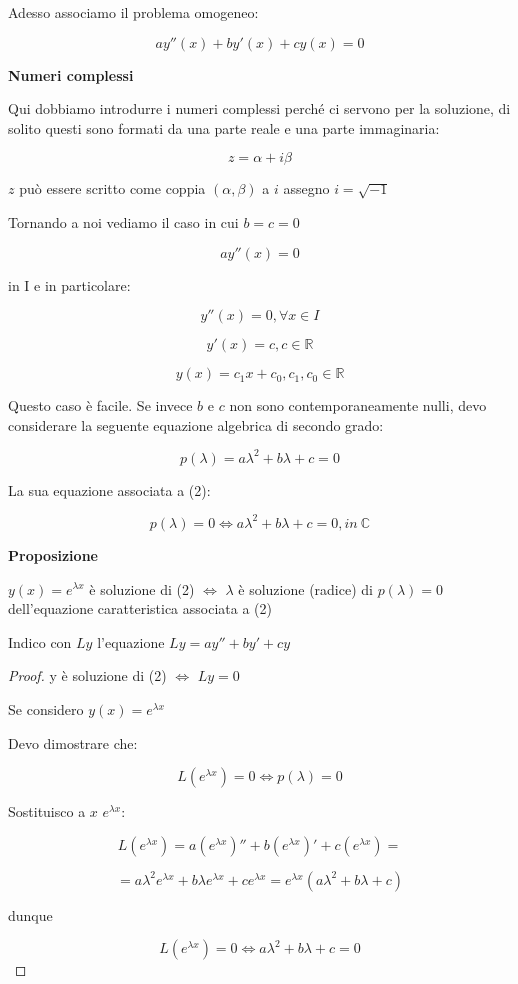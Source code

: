 \documentclass[11pt]{article}
\begin{document}
Adesso associamo il problema omogeneo:

\[
    ay''(x) + by'(x) + cy(x) = 0
\]

\textbf{Numeri complessi} 

Qui dobbiamo introdurre i numeri complessi perché ci servono per la soluzione, di solito questi sono formati da una parte reale e una parte immaginaria:

\[
    z = \alpha + i\beta
\]

$z$ può essere scritto come coppia $(\alpha,\beta)$ a $i$ assegno $i=\sqrt{-1}$

Tornando a noi vediamo il caso in cui $b=c=0$

\[
    ay''(x) = 0
\]

in I e in particolare:

\[
    y''(x) = 0, \forall x \in I
\]

\[
    y'(x) = c, c \in \mathbb{R}
\]

\[
    y(x) = c_1x+c_0,c_1,c_0 \in \mathbb{R}
\]

Questo caso è facile. Se invece $b$ e $c$ non sono contemporaneamente nulli, devo considerare la seguente equazione algebrica di secondo grado:

\[
    p(\lambda) = a \lambda^{2}+b \lambda + c =0
\]

La sua equazione associata a (2):

\[
    p(\lambda) =0 \Leftrightarrow  a \lambda^{2}+b \lambda + c =0, in\ \mathbb{C}
\]



\textbf{Proposizione} 

$y(x) = e ^{\lambda x}$ è soluzione di (2) $\Leftrightarrow $ $\lambda$ è soluzione (radice) di $p(\lambda)=0$ dell'equazione caratteristica associata a (2)

Indico con $Ly$ l'equazione $Ly= ay''+by'+cy$

\begin{proof}
    y è soluzione di (2) $\Leftrightarrow$ $Ly=0$ 

    Se considero $y(x) = e ^{\lambda x}$ 

    Devo dimostrare che:

    \[
        L(e ^{\lambda x}) = 0 \Leftrightarrow  p(\lambda) = 0
    \]

    Sostituisco a $x$ $e ^{\lambda x}$:

    \[
        L(e ^{\lambda x}) = a( e^{\lambda x})'' + b( e ^{\lambda x})' + c(e ^{\lambda x}) =
    \]

    \[
        =a \lambda ^{2} e ^{\lambda x} + b \lambda e ^{\lambda x} + c e^{\lambda x}= e ^{\lambda x}(a \lambda ^{2}+ b \lambda+ c)
    \]

    dunque

    \[
        L( e ^{\lambda x}) = 0 \Leftrightarrow a \lambda ^{2}+ b \lambda +c = 0 
    \]
           
\end{proof}
\end{document}
